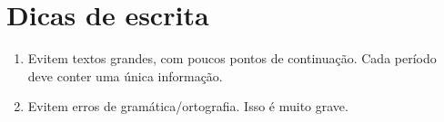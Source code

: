 \section{Dicas de escrita}
\begin{enumerate}
\item Evitem textos grandes, com poucos pontos de continuação. Cada período deve conter uma única informação.
\item Evitem erros de gramática/ortografia. Isso é muito grave.
\end{enumerate}